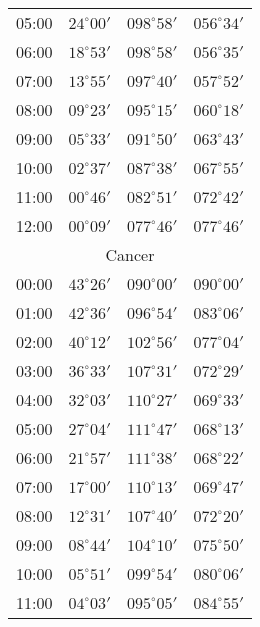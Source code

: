 \begin{table}
\begin{Parallel}{}{}
{{\begin{tabular}{l|lll}
05:00 & $24^\circ 00'$ & $098^\circ 58'$& $056^\circ 34'$ \\
06:00 & $18^\circ 53'$ & $098^\circ 58'$& $056^\circ 35'$ \\
07:00 & $13^\circ 55'$ & $097^\circ 40'$& $057^\circ 52'$ \\
08:00 & $09^\circ 23'$ & $095^\circ 15'$& $060^\circ 18'$ \\
09:00 & $05^\circ 33'$ & $091^\circ 50'$& $063^\circ 43'$ \\
10:00 & $02^\circ 37'$ & $087^\circ 38'$& $067^\circ 55'$ \\
11:00 & $00^\circ 46'$ & $082^\circ 51'$& $072^\circ 42'$ \\
12:00 & $00^\circ 09'$ & $077^\circ 46'$& $077^\circ 46'$ \\
\multicolumn{4}{c}{Cancer}\\
00:00 & $43^\circ 26'$ & $090^\circ 00'$& $090^\circ 00'$ \\
01:00 & $42^\circ 36'$ & $096^\circ 54'$& $083^\circ 06'$ \\
02:00 & $40^\circ 12'$ & $102^\circ 56'$& $077^\circ 04'$ \\
03:00 & $36^\circ 33'$ & $107^\circ 31'$& $072^\circ 29'$ \\
04:00 & $32^\circ 03'$ & $110^\circ 27'$& $069^\circ 33'$ \\
05:00 & $27^\circ 04'$ & $111^\circ 47'$& $068^\circ 13'$ \\
06:00 & $21^\circ 57'$ & $111^\circ 38'$& $068^\circ 22'$ \\
07:00 & $17^\circ 00'$ & $110^\circ 13'$& $069^\circ 47'$ \\
08:00 & $12^\circ 31'$ & $107^\circ 40'$& $072^\circ 20'$ \\
09:00 & $08^\circ 44'$ & $104^\circ 10'$& $075^\circ 50'$ \\
10:00 & $05^\circ 51'$ & $099^\circ 54'$& $080^\circ 06'$ \\
11:00 & $04^\circ 03'$ & $095^\circ 05'$& $084^\circ 55'$ \\
\end{tabular}
}}
\end{Parallel}
\end{table}
